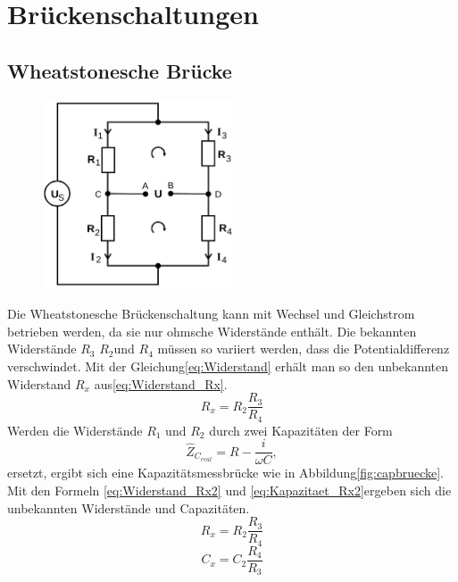 \section{Brückenschaltungen}
\subsection{Wheatstonesche Brücke}
\begin{figure}
  \centering
  \includegraphics[width=0.5\textwidth]{Bilder/Brueckenschaltung.png}
  \caption{}
  \label{fig:}
\end{figure}
Die Wheatstonesche Brückenschaltung kann mit Wechsel und Gleichstrom betrieben werden,
da sie nur ohmsche Widerstände enthält. Die bekannten Widerstände $R_3$ $R_2$und $R_4$
 müssen so variiert werden, dass die Potentialdifferenz verschwindet. Mit der
Gleichung\eqref{eq:Widerstand} erhält man so den unbekannten Widerstand $R_x$
aus\eqref{eq:Widerstand_Rx}.
\begin{equation}
R_x=R_2 \frac{R_3}{R_4}
\label{eq:Widerstand_Rx1}
\end{equation}
Werden die Widerstände $R_1$ und $R_2$ durch zwei Kapazitäten der Form
\begin{equation}
\hat{Z}_{C_{real}}=R-\frac{i}{\omega C}  ,
\end{equation}
ersetzt, ergibt sich eine Kapazitätsmessbrücke  wie in Abbildung\ref{fig:capbruecke}.
Mit den Formeln \eqref{eq:Widerstand_Rx2} und \eqref{eq:Kapazitaet_Rx2}ergeben
sich die unbekannten Widerstände und Capazitäten.
\begin{equation}
R_x=R_2\frac{R_3}{R_4}
\label{eq:Widerstand_Rx2}
\end{equation}
\begin{equation}
C_x=C_2\frac{R_4}{R_3}
\label{eq:Kapazitaet_Rx2}
\end{equation}
